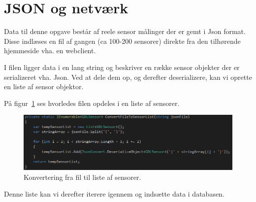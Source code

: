 \section{JSON og netværk}



Data til denne opgave består af reele sensor målinger der er gemt i Json format. Disse indlæses en fil af gangen (ca 100-200 sensorer) direkte fra den tilhørende hjemmeside vha. en webclient.

I filen ligger data i en lang string og beskriver en række sensor objekter der er serializeret vha. Json. Ved at dele dem op, og derefter deserializere, kan vi oprette en liste af sensor objektor.

På figur~\ref{fig:jsonToSensor} ses hvorledes filen opdeles i en liste af sensorer.

\begin{figure}[h]
	\centering
	\includegraphics[width=0.8\linewidth]{figs/jsonToSensor}
	\caption{Konvertering fra fil til liste af sensorer.}
	\label{fig:jsonToSensor}
\end{figure}

Denne liste kan vi derefter iterere igennem og indsætte data i databasen.